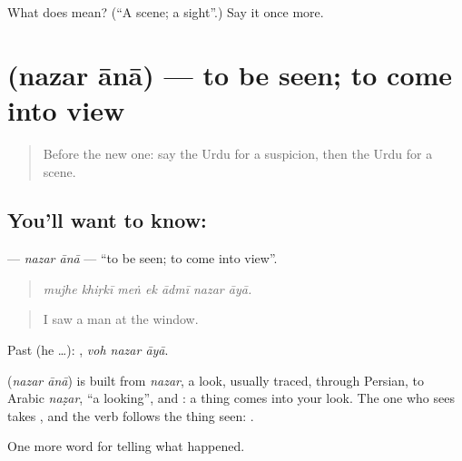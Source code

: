 \begin{tcolorbox}[breakable,colback=teal!4,colframe=teal!35!black,title={Before you move on}]
What does  mean? (\textquotedblleft{}A scene; a sight\textquotedblright{}.) Say it once more.
\end{tcolorbox}
\section[\texorpdfstring{\ur{نظر} \ur{آنا} (nazar ānā)}{نظر آنا (nazar ānā)}]{  (nazar ānā) — to be seen; to come into view}

\label{lesson:UR-C279-nazar-ana}



\begin{quote}
Before the new one: say the Urdu for a suspicion, then the Urdu for a scene.
\end{quote}

\subsection*{You'll want to know:  }
\textbf{ } — \emph{nazar ānā} — \textquotedblleft{}to be seen; to come into view\textquotedblright{}.

\begin{quote}
      
\end{quote}

\begin{quote}
\emph{mujhe khiṛkī meṅ ek ādmī nazar āyā.}
\end{quote}

\begin{quote}
I saw a man at the window.
\end{quote}

Past (he …):   , \emph{voh nazar āyā}.

\begin{cousinweb}
\textbf{ } (\emph{nazar ānā}) is built from \emph{nazar}, a look, usually traced, through Persian, to Arabic \emph{naẓar}, \textquotedblleft{}a looking\textquotedblright{}, and \textbf{}: a thing comes into your look. The one who sees takes \textbf{}, and the verb follows the thing seen: \textbf{  }.
\end{cousinweb}

\begin{grammarlens}[title={What you've built}]
One more word for telling what happened.
\end{grammarlens}

